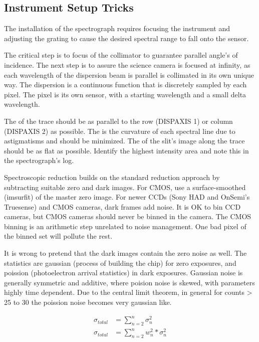 \subsection{Instrument Setup Tricks}


The installation of the spectrograph requires focusing the instrument
and adjusting the grating to cause the desired spectral range to fall 
onto the sensor.

The critical step is to focus of the collimator to guarantee parallel
angle's of incidence. The next step is to assure the science camera
is focused at infinity, as each wavelength of the dispersion beam
is parallel is collimated in its own unique way. The dispersion is
a continuous function that is discretely sampled by each pixel. The
pixel is its own sensor, with a starting wavelength and a small delta
wavelength. 

The   of the trace should be as
parallel to the row (DISPAXIS 1) or column (DISPAXIS 2) as
possible. The   is the curvature
of each spectral line due to astigmatisms and should be minimized. The
 of the slit's image along the trace should be as flat
as possible. Identify the highest intensity area and note this in the
spectrograph's log.

Spectroscopic reduction builds on the standard reduction approach by
subtracting suitable zero and dark images. For CMOS, use a
surface-smoothed (imsurfit)  of the master zero
image. For newer CCDs (Sony HAD and OnSemi's Truesense) and CMOS
cameras, dark frames add noise. It is OK to bin CCD cameras, but
CMOS cameras should never be binned in the camera. The CMOS binning
is an arithmetic step unrelated to noise management. One bad pixel
of the binned set will pollute the rest.

It is wrong to pretend that the dark images contain the zero noise
as well. The statistics are gaussian (process of building the chip)
for zero exposures, and poission (photoelectron arrival statistics)
in dark exposures. Gaussian noise is generally symmetric and additive,
where poision noise is skewed, with parameters highly time dependent.
Due to the central limit theorem, in general for counts > 25 to 30
the poission noise becomes very gaussian like. 

\begin{subequations}
\begin{align}
\sigma_{total} &= \sum_{n=2}^{n}  \sigma_{n}^2 \\
\sigma_{total} &= \sum_{n=2}^{n}  w_{n}^2*\sigma_{n}^2
\end{align}
\end{subequations}


